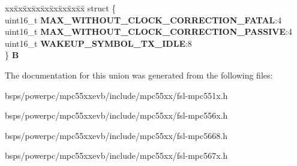 \begin{DoxyCompactItemize}
\begin{tabbing}
\end{tabbing}\item 
\mbox{\label{unionuPCR8_a6fb10cbb226a8a5875c91fcfa61b7529}} 
\begin{tabbing}
xx\=xx\=xx\=xx\=xx\=xx\=xx\=xx\=xx\=\kill
struct \{\\
\>uint16\_t {\bfseries MAX\_WITHOUT\_CLOCK\_CORRECTION\_FATAL}:4\\
\>uint16\_t {\bfseries MAX\_WITHOUT\_CLOCK\_CORRECTION\_PASSIVE}:4\\
\>uint16\_t {\bfseries WAKEUP\_SYMBOL\_TX\_IDLE}:8\\
\} {\bfseries B}\\

\end{tabbing}\end{DoxyCompactItemize}


The documentation for this union was generated from the following files\+:\begin{DoxyCompactItemize}
\item 
bsps/powerpc/mpc55xxevb/include/mpc55xx/fsl-\/mpc551x.\+h\item 
bsps/powerpc/mpc55xxevb/include/mpc55xx/fsl-\/mpc556x.\+h\item 
bsps/powerpc/mpc55xxevb/include/mpc55xx/fsl-\/mpc5668.\+h\item 
bsps/powerpc/mpc55xxevb/include/mpc55xx/fsl-\/mpc567x.\+h\end{DoxyCompactItemize}
